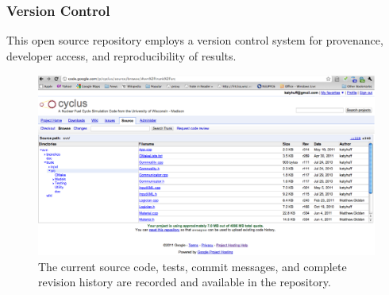 \begin{frame}[ctb!]
  \frametitle{Version Control}
    This open source repository employs a version control system 
     for provenance, developer access, and reproducibility of results.
  \begin{figure}[htbp!]
    \begin{center}
      \includegraphics[height=6cm]{source.eps}
    \end{center}
    \caption{The current source code, tests, commit messages, and complete 
    revision history are recorded and available in the repository.}
    \label{fig:source}
  \end{figure}
\end{frame}

